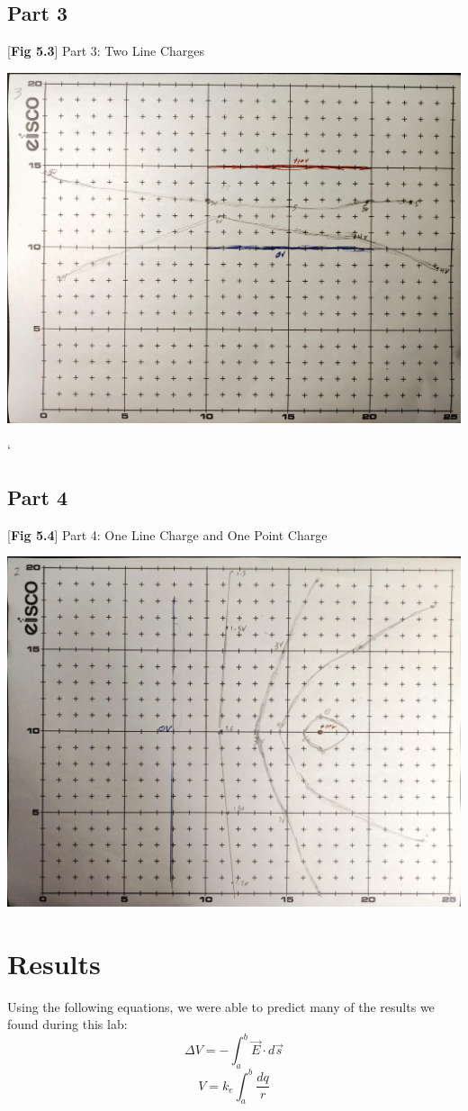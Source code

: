 \documentclass[titlepage]{article}
\begin{document}
	\subsection{Part 3}
	\begin{center}
			[\textbf{Fig 5.3}] Part 3: Two Line Charges	
	\end{center}
		\begin{center}
			\includegraphics[width=0.5\linewidth, frame]{part3}
		\end{center}
`	\subsection{Part 4}
		\begin{center}
			[\textbf{Fig 5.4}] Part 4: One Line Charge and One Point Charge	
		\end{center}

		\begin{center}
			\includegraphics[width=0.5\linewidth, frame]{part4}
		\end{center}
	\section{Results}
    Using the following equations, we were able to predict many of the results we found during this lab:
    $$\Delta V = -\int_a^b \vec{E}\cdot d\vec{s} $$
    $$V= k_e \int_a^b \frac{dq}{r} $$
\end{document}
